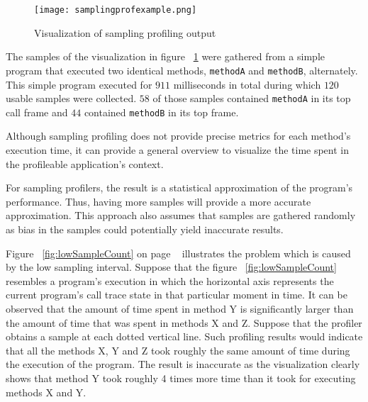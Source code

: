 \documentclass[..thesis.tex]{subfiles}
\begin{document}


\begin{figure}[H]
\texttt{[image: samplingprofexample.png]}
\caption{Visualization of sampling profiling output}
\label{fig:samplingProf}
\end{figure}

The samples of the visualization in figure ~\ref{fig:samplingProf} were gathered from a simple program that executed two identical methods, \texttt{methodA} and \texttt{methodB}, alternately. This simple program executed for $911$ milliseconds in total during which $120$ usable samples were collected. $58$ of those samples contained \texttt{methodA} in its top call frame and $44$ contained \texttt{methodB} in its top frame.


Although sampling profiling does not provide precise metrics for each method's execution time, it can provide a general overview to visualize the time spent in the profileable application's context. 

For sampling profilers, the result is a statistical approximation of the program's performance. Thus, having more samples will provide a more accurate approximation. This approach also assumes that samples are gathered randomly as bias in the samples could potentially yield inaccurate results. 


Figure ~\ref{fig:lowSampleCount} on page ~\pageref{fig:lowSampleCount} illustrates the problem which is caused by the low sampling interval. Suppose that the figure ~\ref{fig:lowSampleCount} resembles a program's execution in which the horizontal axis represents the current program's call trace state in that particular moment in time. It can be observed that the amount of time spent in method Y is significantly larger than the amount of time that was spent in methods X and Z. Suppose that the profiler obtains a sample at each dotted vertical line. Such profiling results would indicate that all the methods X, Y and Z took roughly the same amount of time during the execution of the program. The result is inaccurate as the visualization clearly shows that method Y took roughly 4 times more time than it took for executing methods X and Y.
\end{document}
